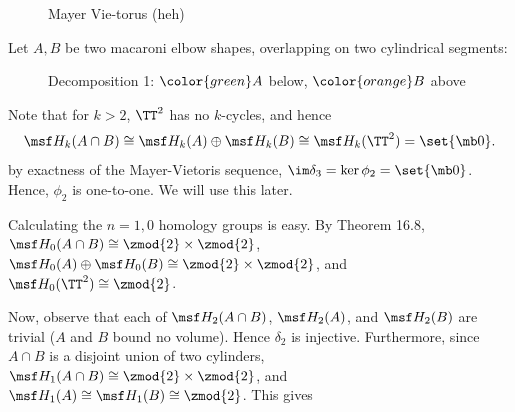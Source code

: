 \begin{solution}
\begin{figure}[H]
    \caption{Mayer Vie-torus (heh)}
  \end{figure}
  Let $A,B$ be two macaroni elbow shapes, overlapping on two
  cylindrical segments:
  \begin{figure}[h]
    \centering
    \caption{Decomposition 1: $\color{green} A$ below, $\color{orange}
      B$ above}
  \end{figure}
  Note that for $k > 2$, $\TT^2$ has no $k$-cycles, and hence
  \[
    \msf H_k(A\cap B)  \cong \msf H_k(A) \oplus \msf H_k(B) \cong \msf
    H_k(\TT^2) = \set{\mb 0}.
  \]
  by exactness of the Mayer-Vietoris sequence, $\im \delta_3 = \ker
  \phi_2 = \set{\mb 0}$. Hence, $\phi_2$ is one-to-one. We will use
  this later.

  Calculating the $n=1,0$ homology groups is easy. By Theorem 16.8,
  $\msf H_0(A \cap B) \cong \zmod{2} \times \zmod{2}$, $\msf H_0(A)
  \oplus \msf H_0(B) \cong \zmod{2}\times \zmod{2}$, and $\msf
  H_0(\TT^2) \cong \zmod{2}$.

  Now, observe that each of $\msf H_2(A \cap B)$, $\msf H_2(A)$, and
  $\msf H_2(B)$ are trivial ($A$ and $B$ bound no volume). Hence
  $\delta_2$ is injective. Furthermore, since $A \cap B$ is a disjoint
  union of two cylinders, $\msf H_1(A \cap B) \cong \zmod{2} \times
  \zmod{2}$, and $\msf H_1(A) \cong \msf H_1(B) \cong \zmod{2}$. This
  gives
  \begin{figure}[H]
    \centering
\end{figure}
\end{solution}
